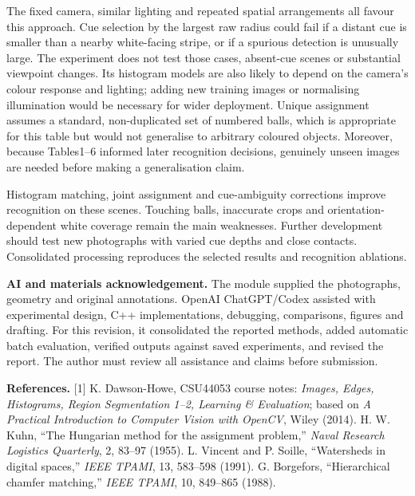 \documentclass[12pt,a4paper]{article}
\begin{document}
The fixed camera, similar lighting and repeated spatial arrangements all favour this approach. Cue selection by the largest raw radius could fail if a distant cue is smaller than a nearby white-facing stripe, or if a spurious detection is unusually large. The experiment does not test those cases, absent-cue scenes or substantial viewpoint changes. Its histogram models are also likely to depend on the camera's colour response and lighting; adding new training images or normalising illumination would be necessary for wider deployment. Unique assignment assumes a standard, non-duplicated set of numbered balls, which is appropriate for this table but would not generalise to arbitrary coloured objects. Moreover, because Tables1--6 informed later recognition decisions, genuinely unseen images are needed before making a generalisation claim.

Histogram matching, joint assignment and cue-ambiguity corrections improve recognition on these scenes. Touching balls, inaccurate crops and orientation-dependent white coverage remain the main weaknesses. Further development should test new photographs with varied cue depths and close contacts. Consolidated processing reproduces the selected results and recognition ablations.

{\small\textbf{AI and materials acknowledgement.} The module supplied the photographs, geometry and original annotations. OpenAI ChatGPT/Codex assisted with experimental design, C++ implementations, debugging, comparisons, figures and drafting. For this revision, it consolidated the reported methods, added automatic batch evaluation, verified outputs against saved experiments, and revised the report. The author must review all assistance and claims before submission.}

{\footnotesize\textbf{References.} [1] K. Dawson-Howe, CSU44053 course notes: \emph{Images, Edges, Histograms, Region Segmentation 1--2, Learning \& Evaluation}; based on \emph{A Practical Introduction to Computer Vision with OpenCV}, Wiley (2014). \quad [2] H. W. Kuhn, ``The Hungarian method for the assignment problem,'' \emph{Naval Research Logistics Quarterly}, 2, 83--97 (1955). \quad [3] L. Vincent and P. Soille, ``Watersheds in digital spaces,'' \emph{IEEE TPAMI}, 13, 583--598 (1991). \quad [4] G. Borgefors, ``Hierarchical chamfer matching,'' \emph{IEEE TPAMI}, 10, 849--865 (1988).}
\end{document}
